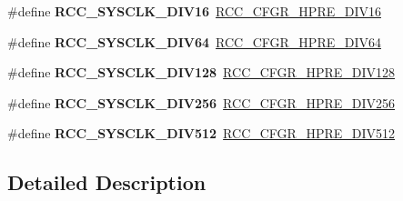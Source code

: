 \begin{DoxyCompactItemize}
\#define {\bfseries R\+C\+C\+\_\+\+S\+Y\+S\+C\+L\+K\+\_\+\+D\+I\+V16}~\mbox{\hyperlink{group___peripheral___registers___bits___definition_ga3806da4f1afc9e5be0fca001c8c57815}{R\+C\+C\+\_\+\+C\+F\+G\+R\+\_\+\+H\+P\+R\+E\+\_\+\+D\+I\+V16}}
\item 
\mbox{\label{group___r_c_c___a_h_b___clock___source_ga73814b5a7ee000687ec8334637ca5b14}} 
\#define {\bfseries R\+C\+C\+\_\+\+S\+Y\+S\+C\+L\+K\+\_\+\+D\+I\+V64}~\mbox{\hyperlink{group___peripheral___registers___bits___definition_ga1caeba8dc2b4c0bb11be600e983e3370}{R\+C\+C\+\_\+\+C\+F\+G\+R\+\_\+\+H\+P\+R\+E\+\_\+\+D\+I\+V64}}
\item 
\mbox{\label{group___r_c_c___a_h_b___clock___source_ga43eddf4d4160df30548a714dce102ad8}} 
\#define {\bfseries R\+C\+C\+\_\+\+S\+Y\+S\+C\+L\+K\+\_\+\+D\+I\+V128}~\mbox{\hyperlink{group___peripheral___registers___bits___definition_ga280da821f0da1bec1f4c0e132ddf8eab}{R\+C\+C\+\_\+\+C\+F\+G\+R\+\_\+\+H\+P\+R\+E\+\_\+\+D\+I\+V128}}
\item 
\mbox{\label{group___r_c_c___a_h_b___clock___source_ga94956d6e9c3a78230bf660b838f987e2}} 
\#define {\bfseries R\+C\+C\+\_\+\+S\+Y\+S\+C\+L\+K\+\_\+\+D\+I\+V256}~\mbox{\hyperlink{group___peripheral___registers___bits___definition_ga089930cedd5b2cb201e717438f29d25b}{R\+C\+C\+\_\+\+C\+F\+G\+R\+\_\+\+H\+P\+R\+E\+\_\+\+D\+I\+V256}}
\item 
\mbox{\label{group___r_c_c___a_h_b___clock___source_gabe18a9d55c0858bbfe3db657fb64c76d}} 
\#define {\bfseries R\+C\+C\+\_\+\+S\+Y\+S\+C\+L\+K\+\_\+\+D\+I\+V512}~\mbox{\hyperlink{group___peripheral___registers___bits___definition_gae5088dcbaefc55d4b6693e9b1e595ed0}{R\+C\+C\+\_\+\+C\+F\+G\+R\+\_\+\+H\+P\+R\+E\+\_\+\+D\+I\+V512}}
\end{DoxyCompactItemize}


\subsection{Detailed Description}
